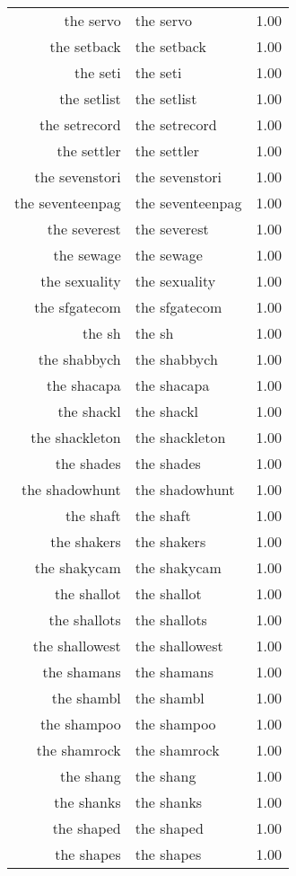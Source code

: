 \begin{table}[ht]
\begin{tabular}{rlr}
  the servo & the servo & 1.00 \\ 
  the setback & the setback & 1.00 \\ 
  the seti & the seti & 1.00 \\ 
  the setlist & the setlist & 1.00 \\ 
  the setrecord & the setrecord & 1.00 \\ 
  the settler & the settler & 1.00 \\ 
  the sevenstori & the sevenstori & 1.00 \\ 
  the seventeenpag & the seventeenpag & 1.00 \\ 
  the severest & the severest & 1.00 \\ 
  the sewage & the sewage & 1.00 \\ 
  the sexuality & the sexuality & 1.00 \\ 
  the sfgatecom & the sfgatecom & 1.00 \\ 
  the sh & the sh & 1.00 \\ 
  the shabbych & the shabbych & 1.00 \\ 
  the shacapa & the shacapa & 1.00 \\ 
  the shackl & the shackl & 1.00 \\ 
  the shackleton & the shackleton & 1.00 \\ 
  the shades & the shades & 1.00 \\ 
  the shadowhunt & the shadowhunt & 1.00 \\ 
  the shaft & the shaft & 1.00 \\ 
  the shakers & the shakers & 1.00 \\ 
  the shakycam & the shakycam & 1.00 \\ 
  the shallot & the shallot & 1.00 \\ 
  the shallots & the shallots & 1.00 \\ 
  the shallowest & the shallowest & 1.00 \\ 
  the shamans & the shamans & 1.00 \\ 
  the shambl & the shambl & 1.00 \\ 
  the shampoo & the shampoo & 1.00 \\ 
  the shamrock & the shamrock & 1.00 \\ 
  the shang & the shang & 1.00 \\ 
  the shanks & the shanks & 1.00 \\ 
  the shaped & the shaped & 1.00 \\ 
  the shapes & the shapes & 1.00 \\ 

\end{tabular}
\end{table}
